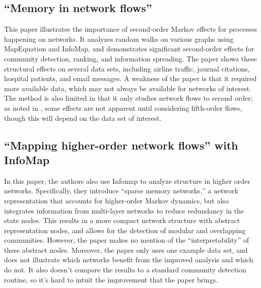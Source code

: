 \documentclass[sigconf]{acmart}
\begin{document}
\subsection{``Memory in network flows'' \cite{Rosvall2014}} \label{paper:memory}
This paper illustrates the importance of second-order Markov effects for processes happening on networks. It analyzes random walks on various graphs using MapEquation and InfoMap, and demonstrates significant second-order effects for community detection, ranking, and information spreading. The paper shows these structural effects on several data sets, including airline traffic, journal citations, hospital patients, and email messages. A weakness of the paper is that it required more available data, which may not always be available for networks of interest. The method is also limited in that it only studies network flows to second order; as noted in \cite{Xu2016}, some effects are not apparent until considering fifth-order flows, though this will depend on the data set of interest.

\subsection{``Mapping higher-order network flows'' with InfoMap \cite{Edler2017}} \label{paper:infomap}
In this paper, the authors also use Infomap to analyze structure in higher order networks. Specifically, they introduce ``sparse memory networks,'' a network representation that accounts for higher-order Markov dynamics, but also integrates information from multi-layer networks to reduce redundancy in the state nodes. This results in a more compact network structure with abstract representation nodes, and allows for the detection of modular and overlapping communities. However, the paper makes no mention of the ``interpretability'' of these abstract nodes. Moreover, the paper only uses one example data set, and does not illustrate which networks benefit from the improved analysis and which do not. It also doesn't compare the results to a standard community detection routine, so it's hard to intuit the improvement that the paper brings. 




\appendix
\end{document}
